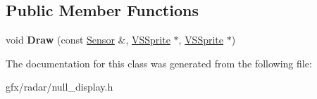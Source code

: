 \subsection*{Public Member Functions}
\begin{DoxyCompactItemize}
\item 
void {\bfseries Draw} (const \hyperlink{classRadar_1_1Sensor}{Sensor} \&, \hyperlink{classVSSprite}{V\+S\+Sprite} $\ast$, \hyperlink{classVSSprite}{V\+S\+Sprite} $\ast$)\hypertarget{classRadar_1_1NullDisplay_a83c45968be77353cf6f67ea6e195800d}{}\label{classRadar_1_1NullDisplay_a83c45968be77353cf6f67ea6e195800d}

\end{DoxyCompactItemize}


The documentation for this class was generated from the following file\+:\begin{DoxyCompactItemize}
\item 
gfx/radar/null\+\_\+display.\+h\end{DoxyCompactItemize}
